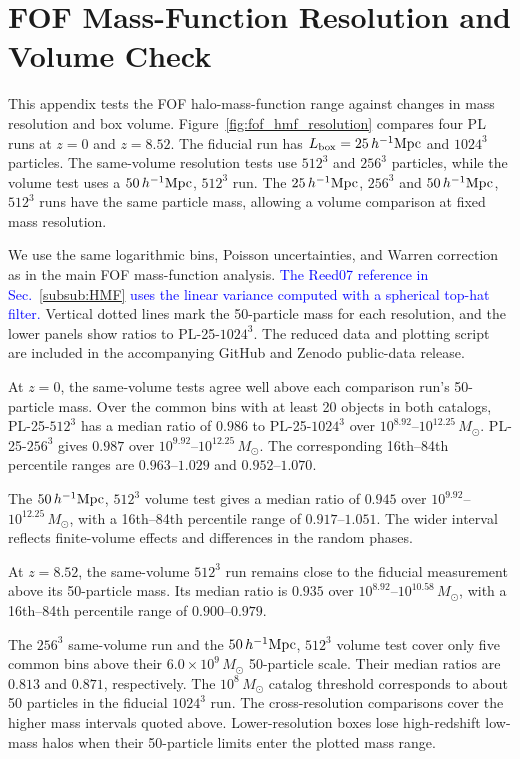 \documentclass[
 reprint,
 superscriptaddress,
 nofootinbib,
 nobibnotes,
 amsmath,
 amssymb,
 aps,
 prd,
 floatfix,
 longbibliography
]{revtex4-2}
\DeclareRobustCommand{\change}[1]{\textcolor{blue}{#1}}
\begin{document}
\section{FOF Mass-Function Resolution and Volume Check}
\label{app:fof_hmf_resolution}

This appendix tests the FOF halo-mass-function range against changes in mass resolution and box volume. Figure~\ref{fig:fof_hmf_resolution} compares four PL runs at \(z=0\) and \(z=8.52\). The fiducial run has \(L_{\rm box}=25\,h^{-1}{\rm Mpc}\) and \(1024^3\) particles. The same-volume resolution tests use \(512^3\) and \(256^3\) particles, while the volume test uses a \(50\,h^{-1}{\rm Mpc}\), \(512^3\) run. The \(25\,h^{-1}{\rm Mpc}\), \(256^3\) and \(50\,h^{-1}{\rm Mpc}\), \(512^3\) runs have the same particle mass, allowing a volume comparison at fixed mass resolution.

We use the same logarithmic bins, Poisson uncertainties, and Warren correction as in the main FOF mass-function analysis. \change{The Reed07 reference in Sec.~\ref{subsub:HMF} uses the linear variance computed with a spherical top-hat filter.} Vertical dotted lines mark the 50-particle mass for each resolution, and the lower panels show ratios to PL-25-\(1024^3\). The reduced data and plotting script are included in the accompanying GitHub and Zenodo public-data release.

At \(z=0\), the same-volume tests agree well above each comparison run's 50-particle mass. Over the common bins with at least 20 objects in both catalogs, PL-25-\(512^3\) has a median ratio of \(0.986\) to PL-25-\(1024^3\) over \(10^{8.92}\)--\(10^{12.25}\,M_\odot\). PL-25-\(256^3\) gives \(0.987\) over \(10^{9.92}\)--\(10^{12.25}\,M_\odot\). The corresponding 16th--84th percentile ranges are \(0.963\)--\(1.029\) and \(0.952\)--\(1.070\).

The \(50\,h^{-1}{\rm Mpc}\), \(512^3\) volume test gives a median ratio of \(0.945\) over \(10^{9.92}\)--\(10^{12.25}\,M_\odot\), with a 16th--84th percentile range of \(0.917\)--\(1.051\). The wider interval reflects finite-volume effects and differences in the random phases.

At \(z=8.52\), the same-volume \(512^3\) run remains close to the fiducial measurement above its 50-particle mass. Its median ratio is \(0.935\) over \(10^{8.92}\)--\(10^{10.58}\,M_\odot\), with a 16th--84th percentile range of \(0.900\)--\(0.979\).

The \(256^3\) same-volume run and the \(50\,h^{-1}{\rm Mpc}\), \(512^3\) volume test cover only five common bins above their \(6.0\times10^9\,M_\odot\) 50-particle scale. Their median ratios are \(0.813\) and \(0.871\), respectively. The \(10^8\,M_\odot\) catalog threshold corresponds to about 50 particles in the fiducial \(1024^3\) run. The cross-resolution comparisons cover the higher mass intervals quoted above. Lower-resolution boxes lose high-redshift low-mass halos when their 50-particle limits enter the plotted mass range.
\end{document}
